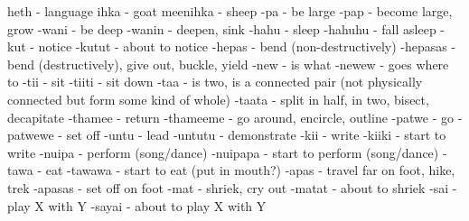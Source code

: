 heth        - language
ihka        - goat
meenihka    - sheep
-pa         - be large
-pap        - become large, grow
-wani       - be deep
-wanin      - deepen, sink
-hahu       - sleep
-hahuhu     - fall asleep
-kut        - notice
-kutut      - about to notice
-hepas      - bend (non-destructively)
-hepasas    - bend (destructively), give out, buckle, yield
-new        - is what
-newew      - goes where to
-tii        - sit
-tiiti      - sit down
-taa        - is two, is a connected pair (not physically connected but form some kind of whole)
-taata      - split in half, in two, bisect, decapitate
-thamee     - return
-thameeme   - go around, encircle, outline
-patwe      - go
-patwewe    - set off
-untu       - lead
-untutu     - demonstrate
-kii        - write
-kiiki      - start to write
-nuipa      - perform (song/dance)
-nuipapa    - start to perform (song/dance)
-tawa       - eat
-tawawa     - start to eat (put in mouth?)
-apas       - travel far on foot, hike, trek
-apasas     - set off on foot
-mat        - shriek, cry out
-matat      - about to shriek
-sai        - play X with Y
-sayai      - about to play X with Y